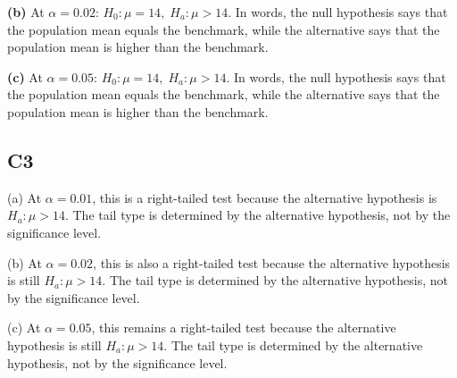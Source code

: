 \begin{ExamProblems}
		\textbf{(b)} At \(\alpha=0.02\): \(H_0\colon \mu=14,\; H_a\colon \mu>14\). In words, the null hypothesis says that the population mean equals the benchmark, while the alternative says that the population mean is higher than the benchmark.
		
		\textbf{(c)} At \(\alpha=0.05\): \(H_0\colon \mu=14,\; H_a\colon \mu>14\). In words, the null hypothesis says that the population mean equals the benchmark, while the alternative says that the population mean is higher than the benchmark.
		
		\subsection*{C3}
		(a) At \(\alpha=0.01\), this is a right-tailed test because the alternative hypothesis is \(H_a\colon \mu>14\). The tail type is determined by the alternative hypothesis, not by the significance level.\RightTailGraph
		
		(b) At \(\alpha=0.02\), this is also a right-tailed test because the alternative hypothesis is still \(H_a\colon \mu>14\). The tail type is determined by the alternative hypothesis, not by the significance level.\RightTailGraph
		
		(c) At \(\alpha=0.05\), this remains a right-tailed test because the alternative hypothesis is still \(H_a\colon \mu>14\). The tail type is determined by the alternative hypothesis, not by the significance level.\RightTailGraph

	\end{ExamProblems}

